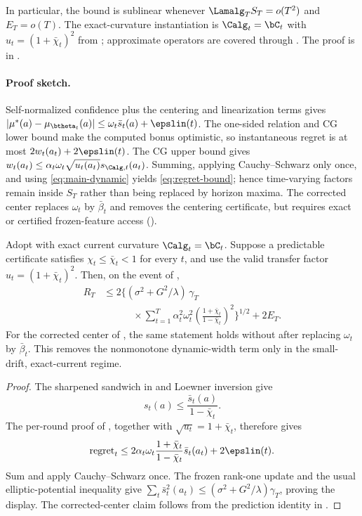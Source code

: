 In particular, the bound is sublinear whenever
$\Lamalg_T S_T=o(T^2)$ and $E_T=o(T)$.
The exact-curvature instantiation is $\Calg_t=\bC_t$ with
$u_t=(1+\bar\chi_t)^2$ from ; approximate operators are
covered through .  The proof is in
.

\paragraph{Proof sketch.}
Self-normalized confidence plus the centering and linearization terms gives
$|\mu^*(a)-\mu_{\btheta_t}(a)|\le\omega_t\bar s_t(a)+\epslin(t)$.
The one-sided relation and CG lower bound make the computed bonus optimistic,
so instantaneous regret is at most $2w_t(a_t)+2\epslin(t)$.  The CG upper
bound gives $w_t(a_t)\le\alpha_t\omega_t\sqrt{u_t(a_t)}s_{\Calg,t}(a_t)$.
Summing, applying Cauchy--Schwarz only once, and using \eqref{eq:main-dynamic}
yields \eqref{eq:regret-bound}; hence time-varying factors remain inside $S_T$
rather than being replaced by horizon maxima.  The corrected center replaces
$\omega_t$ by $\bar\beta_t$ and removes the centering certificate, but requires
exact or certified frozen-feature access ().

\begin{corollary}
\label{cor:exact-current-frozen-potential}
Adopt  with exact current curvature $\Calg_t=\bC_t$.
Suppose a predictable certificate satisfies
$\chi_t\le\bar\chi_t<1$ for every $t$, and use the valid transfer factor
$u_t=(1+\bar\chi_t)^2$.  Then, on the event of ,
\begin{equation}\label{eq:exact-current-frozen-potential}
\begin{aligned}
 R_T&\le 2\Biggl\{(\sigma^2+G^2/\lambda)\,\gamma_T\\[-1mm]
 &\qquad\quad\times\sum_{t=1}^T\alpha_t^2\omega_t^2
 \left(\frac{1+\bar\chi_t}{1-\bar\chi_t}\right)^2\Biggr\}^{1/2}
 +2E_T.
\end{aligned}
\end{equation}
For the corrected center of , the same statement
holds without  after replacing $\omega_t$ by $\bar\beta_t$.
This removes the nonmonotone dynamic-width term only in the small-drift,
exact-current regime.
\end{corollary}
\begin{proof}
The sharpened sandwich in  and Loewner inversion give
\[
 s_t(a)\le\frac{\bar s_t(a)}{1-\bar\chi_t}.
\]
The per-round proof of , together with
$\sqrt{u_t}=1+\bar\chi_t$, therefore gives
\[
 \operatorname{regret}_t\le
 2\alpha_t\omega_t
 \frac{1+\bar\chi_t}{1-\bar\chi_t}\bar s_t(a_t)
 +2\epslin(t).
\]
Sum and apply Cauchy--Schwarz once.  The frozen rank-one update and the usual
elliptic-potential inequality give
$\sum_t\bar s_t^2(a_t)\le
(\sigma^2+G^2/\lambda)\gamma_T$, proving the display.  The corrected-center
claim follows from the prediction identity in .
\end{proof}

